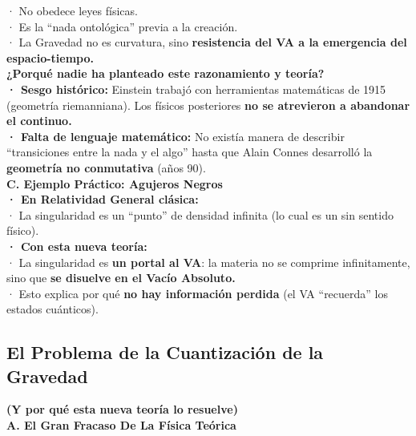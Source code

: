 \documentclass[a4paper]{article}
\theoremstyle{definition}
\theoremstyle{remark}
\numberwithin{equation}{section}
\begin{document}
	· No obedece leyes físicas.\\
	
	· Es la ``nada ontológica'' previa a la creación.\\
	
	· La Gravedad no es curvatura, sino \textbf{resistencia del VA a la emergencia del espacio-tiempo.}\\
	
	\textbf{¿Porqué nadie ha planteado este razonamiento y teoría? \cite{Smolin2006}}\\
	
	\textbf{· Sesgo histórico:} Einstein trabajó con herramientas matemáticas de 1915 (geometría riemanniana). Los físicos posteriores \textbf{no se atrevieron a abandonar el continuo.}\\
	
	\textbf{· Falta de lenguaje matemático:} No existía manera de describir ``transiciones entre la nada y el algo'' hasta que Alain Connes \cite{Connes} desarrolló la \textbf{geometría no conmutativa} (años 90).\\
	
	
	\textbf{C. Ejemplo Práctico: Agujeros Negros}\\
	
	\textbf{· En Relatividad General clásica:}\\
	
	· La singularidad es un ``punto'' de densidad infinita (lo cual es un sin sentido físico).\\
	
	\textbf{· Con esta nueva teoría:}\\
	
	· La singularidad es \textbf{un portal al VA}: la materia no se comprime infinitamente, sino que \textbf{se disuelve en el Vacío Absoluto.}\\
	
	· Esto explica por qué \textbf{no hay información perdida} (el VA ``recuerda'' los estados cuánticos).
	
	\subsection{El Problema de la Cuantización de la Gravedad}
	
	\textbf{(Y por qué esta nueva teoría lo resuelve)}\\
	
	\textbf{A. El Gran Fracaso De La Física Teórica}\\
	
\end{document}
